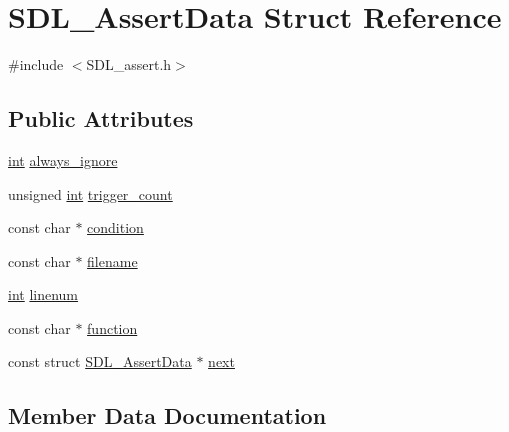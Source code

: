 \hypertarget{struct_s_d_l___assert_data}{}\section{S\+D\+L\+\_\+\+Assert\+Data Struct Reference}
\label{struct_s_d_l___assert_data}


{\ttfamily \#include $<$S\+D\+L\+\_\+assert.\+h$>$}

\subsection*{Public Attributes}
\begin{DoxyCompactItemize}
\item 
\mbox{\hyperlink{warnings_8h_a74f207b5aa4ba51c3a2ad59b219a423b}{int}} \mbox{\hyperlink{struct_s_d_l___assert_data_a825e1c7772fe24afad33d0afc42cf04c}{always\+\_\+ignore}}
\item 
unsigned \mbox{\hyperlink{warnings_8h_a74f207b5aa4ba51c3a2ad59b219a423b}{int}} \mbox{\hyperlink{struct_s_d_l___assert_data_a230bbcc2d115aab04cf817773e08eb5b}{trigger\+\_\+count}}
\item 
const char $\ast$ \mbox{\hyperlink{struct_s_d_l___assert_data_aec6d372462fa8c94a9d04c1168cd38c9}{condition}}
\item 
const char $\ast$ \mbox{\hyperlink{struct_s_d_l___assert_data_acf27f593e6a436386d2cbcf826cf1ef7}{filename}}
\item 
\mbox{\hyperlink{warnings_8h_a74f207b5aa4ba51c3a2ad59b219a423b}{int}} \mbox{\hyperlink{struct_s_d_l___assert_data_ad026d8573970d2402230d5fa3c550b0f}{linenum}}
\item 
const char $\ast$ \mbox{\hyperlink{struct_s_d_l___assert_data_a4913c57d4affb813feea82fc5f48a25c}{function}}
\item 
const struct \mbox{\hyperlink{struct_s_d_l___assert_data}{S\+D\+L\+\_\+\+Assert\+Data}} $\ast$ \mbox{\hyperlink{struct_s_d_l___assert_data_a2081dcf06dce4df497e423bccddfc099}{next}}
\end{DoxyCompactItemize}


\subsection{Member Data Documentation}
\mbox{\label{struct_s_d_l___assert_data_a825e1c7772fe24afad33d0afc42cf04c}} 

